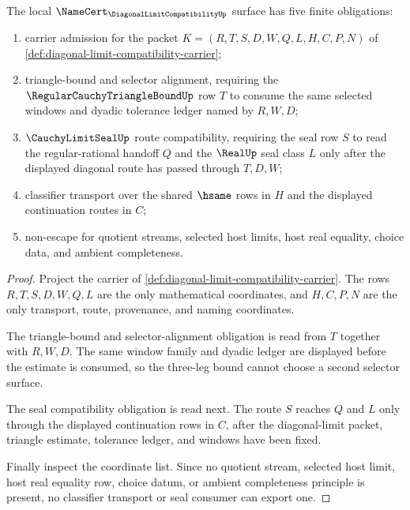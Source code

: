\begin{theorem}
\label{thm:diagonal-limit-compatibility-namecert-obligations}
The local $\NameCert_{\DiagonalLimitCompatibilityUp}$ surface has five finite
obligations:
\begin{enumerate}
\item carrier admission for the packet
$K=(R,T,S,D,W,Q,L,H,C,P,N)$ of
\autoref{def:diagonal-limit-compatibility-carrier};
\item triangle-bound and selector alignment, requiring the
$\RegularCauchyTriangleBoundUp$ row $T$ to consume the same selected windows
and dyadic tolerance ledger named by $R,W,D$;
\item $\CauchyLimitSealUp$ route compatibility, requiring the seal row $S$ to
read the regular-rational handoff $Q$ and the $\RealUp$ seal class $L$ only
after the displayed diagonal route has passed through $T,D,W$;
\item classifier transport over the shared $\hsame$ rows in $H$ and the
displayed continuation routes in $C$;
\item non-escape for quotient streams, selected host limits, host real
equality, choice data, and ambient completeness.
\end{enumerate}
\end{theorem}
\begin{proof}
Project the carrier of
\autoref{def:diagonal-limit-compatibility-carrier}. The rows
$R,T,S,D,W,Q,L$ are the only mathematical coordinates, and $H,C,P,N$ are the
only transport, route, provenance, and naming coordinates.

The triangle-bound and selector-alignment obligation is read from $T$ together
with $R,W,D$. The same window family and dyadic ledger are displayed before
the estimate is consumed, so the three-leg bound cannot choose a second
selector surface.

The seal compatibility obligation is read next. The route $S$ reaches $Q$ and
$L$ only through the displayed continuation rows in $C$, after the
diagonal-limit packet, triangle estimate, tolerance ledger, and windows have
been fixed.

Finally inspect the coordinate list. Since no quotient stream, selected host
limit, host real equality row, choice datum, or ambient completeness principle
is present, no classifier transport or seal consumer can export one.
\end{proof}

